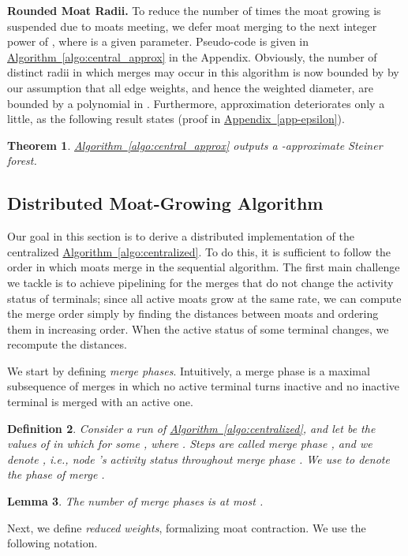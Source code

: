 \documentclass[letterpaper,11pt]{article}
\newtheorem{theorem}{Theorem}[section]
\newtheorem{lemma}[theorem]{Lemma}
\newtheorem{definition}[theorem]{Definition}
\newcommand{\namedref}[2]{\hyperref[#2]{#1~\ref*{#2}}}
\newcommand{\appref}[1]{\namedref{Appendix}{#1}}
\newcommand{\algref}[1]{\namedref{Algorithm}{#1}}
\renewcommand{\paragraph}[1]{\smallskip\par\noindent\textbf{#1}}
\begin{document}
\paragraph{Rounded Moat Radii.}
To reduce the
number of times the moat growing is suspended due to moats meeting, 
we defer moat merging  to the next integer power of
, where  is a given
parameter. Pseudo-code is given in 
\algref{algo:central_approx} in the Appendix.
Obviously, the 
number of distinct radii in which merges may occur in this algorithm
is now
bounded by  by our assumption that all edge weights, and hence
the weighted diameter, are bounded by a polynomial in
. Furthermore, approximation deteriorates only a little, as the
following result  states (proof in
\appref{app-epsilon}). 

\begin{theorem}\label{theorem:2+eps_approx}
\algref{algo:central_approx} outputs a -approximate Steiner
forest.
\end{theorem}



\subsection{Distributed Moat-Growing Algorithm}
\label{ssec-dist}
Our goal in this section is to derive a distributed implementation of the
centralized \algref{algo:centralized}. To do this, it is sufficient to follow
the order in which moats merge in the sequential algorithm. The first main
challenge we tackle is to achieve pipelining for the merges that do not change
the activity status of terminals; since all active moats grow at the same rate,
we can compute the merge order simply by finding the distances between moats and
ordering them in increasing order. When the active status of some terminal
changes, we recompute the distances.


We start by defining \emph{merge phases}. Intuitively, a merge phase is a
maximal subsequence of merges in which no active terminal turns inactive and no
inactive terminal is merged with an active one.

\begin{definition}\label{def:merge}
Consider a run of \algref{algo:centralized}, and let 
   be the values of  in which  for some , where . Steps
   are called \emph{merge phase }, and we denote
  , i.e., node 's activity status
  throughout merge phase . We use  to denote the \emph{phase of merge
  }.
\end{definition}
\begin{lemma}\label{lem-numphases}
  The number of merge phases is at most . 
\end{lemma}
Next, we define \emph{reduced weights}, formalizing moat contraction.
We use the following notation.
\end{document}
